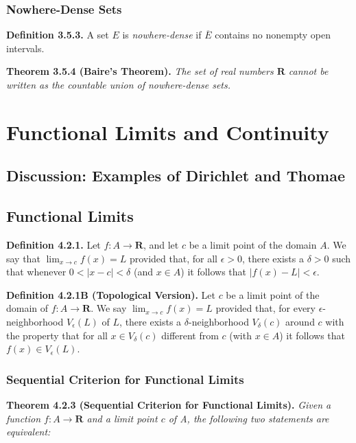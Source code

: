 \documentclass[12pt]{report}
\newcommand{\R}{\textbf{R}}
\newcommand{\close}[1]{\overline{#1}}
\begin{document}
\subsection*{Nowhere-Dense Sets}

\noindent \textbf{Definition 3.5.3.}  A set $E$ is \textit{nowhere-dense} if $\close{E}$ contains no nonempty open intervals.
\bigskip

\noindent \textbf{Theorem 3.5.4 (Baire's Theorem).} \textit{The set of real numbers $\R$ cannot be written as the countable union of nowhere-dense sets.}
\bigskip

\chapter{Functional Limits and Continuity}

\section{Discussion: Examples of Dirichlet and Thomae}

\section{Functional Limits}

\noindent \textbf{Definition 4.2.1.} Let $f:A\rightarrow\R$, and let $c$ be a limit point of the domain $A$.  We say that $\lim_{x\rightarrow c} f(x)=L$ provided that, for all $\epsilon>0$, there exists a $\delta>0$ such that whenever $0<|x-c|<\delta$ (and $x\in A$) it follows that $|f(x)-L|<\epsilon$.
\bigskip

\noindent \textbf{Definition 4.2.1B (Topological Version).}  Let $c$ be a limit point of the domain of $f:A\rightarrow\R$.  We say $\lim_{x\rightarrow c} f(x)=L$ provided that, for every $\epsilon$-neighborhood $V_\epsilon(L)$ of $L$, there exists a $\delta$-neighborhood $V_\delta(c)$ around $c$ with the property that for all $x\in V_\delta(c)$ different from $c$ (with $x\in A$) it follows that $f(x)\in V_\epsilon(L)$.
\bigskip

\subsection*{Sequential Criterion for Functional Limits}

\noindent \textbf{Theorem 4.2.3 (Sequential Criterion for Functional Limits).} \textit{Given a function $f:A\rightarrow\R$ and a limit point $c$ of A, the following two statements are equivalent:}
\end{document}
